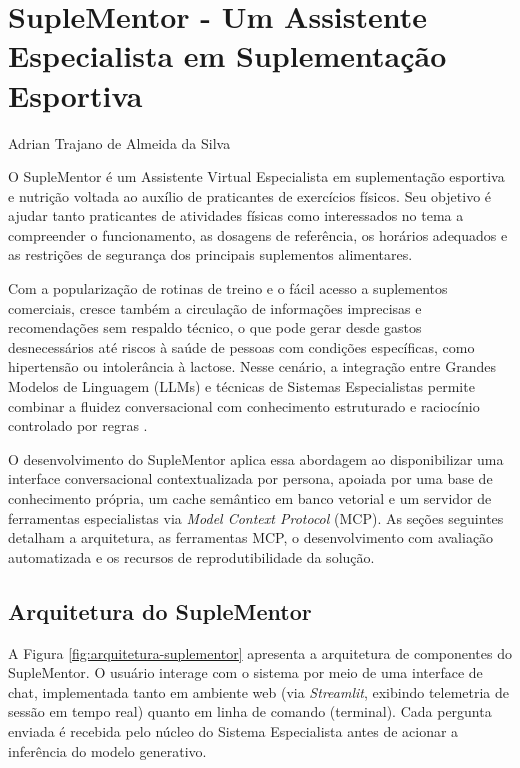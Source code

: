 \chapter{SupleMentor - Um Assistente Especialista em Suplementação Esportiva}

\begin{flushright}
Adrian Trajano de Almeida da Silva
\end{flushright}

O SupleMentor é um Assistente Virtual Especialista em suplementação esportiva e nutrição voltada ao auxílio de praticantes de exercícios físicos. Seu objetivo é ajudar tanto praticantes de atividades físicas como interessados no tema a compreender o funcionamento, as dosagens de referência, os horários adequados e as restrições de segurança dos principais suplementos alimentares.

Com a popularização de rotinas de treino e o fácil acesso a suplementos comerciais, cresce também a circulação de informações imprecisas e recomendações sem respaldo técnico, o que pode gerar desde gastos desnecessários até riscos à saúde de pessoas com condições específicas, como hipertensão ou intolerância à lactose. Nesse cenário, a integração entre Grandes Modelos de Linguagem (LLMs) e técnicas de Sistemas Especialistas permite combinar a fluidez conversacional com conhecimento estruturado e raciocínio controlado por regras \cite{yang2025comprehensive, garridomerchan2026gofai}.

O desenvolvimento do SupleMentor aplica essa abordagem ao disponibilizar uma interface conversacional contextualizada por persona, apoiada por uma base de conhecimento própria, um cache semântico em banco vetorial e um servidor de ferramentas especialistas via \textit{Model Context Protocol} (MCP). As seções seguintes detalham a arquitetura, as ferramentas MCP, o desenvolvimento com avaliação automatizada e os recursos de reprodutibilidade da solução.

\section{Arquitetura do SupleMentor}

A Figura \ref{fig:arquitetura-suplementor} apresenta a arquitetura de componentes do SupleMentor. O usuário interage com o sistema por meio de uma interface de chat, implementada tanto em ambiente web (via \textit{Streamlit}, exibindo telemetria de sessão em tempo real) quanto em linha de comando (terminal). Cada pergunta enviada é recebida pelo núcleo do Sistema Especialista antes de acionar a inferência do modelo generativo.

